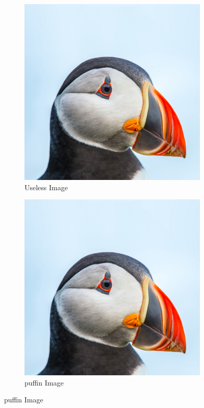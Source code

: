 \begin{figure} [H]
    \centering
    \begin{subfigure}[b]{.45\linewidth}
        \includegraphics[width=\linewidth]{puffin}
        \caption{Useless Image}\label{fig:puffin1}
    \end{subfigure}
    \begin{subfigure}[b]{.45\linewidth}
        \includegraphics[width=\linewidth]{puffin}
        \caption{puffin Image}\label{fig:puffin2}
    \end{subfigure}


\end{figure}

